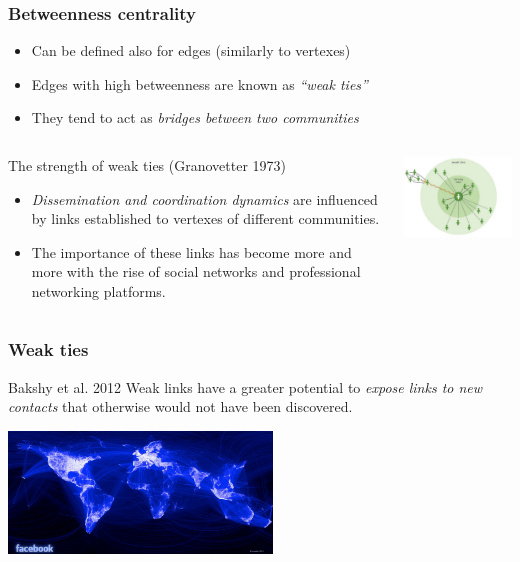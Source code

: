 \begin{frame}
  \frametitle{Betweenness centrality}
  \begin{itemize}
    \item Can be defined also for edges (similarly to vertexes)
    \item Edges with high betweenness are known as \emph{``weak ties''}
    \item They tend to act as \emph{bridges between two communities}
  \end{itemize}
  \begin{columns}[T]
    \begin{column}{60mm}
      \begin{block}{The strength of weak ties (Granovetter 1973)}
        \begin{itemize}
          \item \emph{Dissemination and coordination dynamics} are influenced
            by links established to vertexes of different communities.
          \item The importance of these links has become more and more with
            the rise of social networks and professional networking platforms.
        \end{itemize}
      \end{block}
    \end{column}
    \hspace{-16mm}\begin{column}{40mm}
      \includegraphics[width=62mm]{imgs/weak_ties.pdf}
    \end{column}
  \end{columns}
\end{frame}

\begin{frame}
  \frametitle{Weak ties}
  \begin{block}{Bakshy et al. 2012}
    Weak links have a greater potential to \emph{expose links to new contacts}
    that otherwise would not have been discovered.
  \end{block}
  \begin{center}
    \includegraphics[width=70mm]{imgs/facebook_graph.pdf}
  \end{center}
\end{frame}

